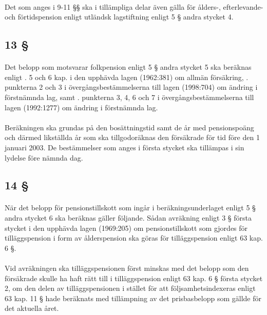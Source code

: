 \documentclass[a4paper,notitlepage,openany,10pt]{book}
\begin{document}
\paragraph*{}
Det som anges i 9-11 §§ ska i tillämpliga delar även gälla för ålders-, efterlevande- och förtidspension enligt utländsk lagstiftning enligt 5 § andra stycket 4.
\subsection*{13 §}
\paragraph*{}
Det belopp som motsvarar folkpension enligt 5 § andra stycket 5 ska beräknas enligt
. 5 och 6 kap. i den upphävda lagen (1962:381) om allmän försäkring,
. punkterna 2 och 3 i övergångsbestämmelserna till lagen (1998:704) om ändring i förstnämnda lag, samt
. punkterna 3, 4, 6 och 7 i övergångsbestämmelserna till lagen (1992:1277) om ändring i förstnämnda lag.
\paragraph*{}
Beräkningen ska grundas på den bosättningstid samt de år med pensionspoäng och därmed likställda år som ska tillgodoräknas den försäkrade för tid före den 1 januari 2003. De bestämmelser som anges i första stycket ska tillämpas i sin lydelse före nämnda dag.
\subsection*{14 §}
\paragraph*{}
När det belopp för pensionstillskott som ingår i beräkningsunderlaget enligt 5 § andra stycket 6 ska beräknas gäller följande. Sådan avräkning enligt 3 § första stycket i den upphävda lagen (1969:205) om pensionstillskott som gjordes för tilläggspension i form av ålderspension ska göras för tilläggspension enligt 63 kap. 6 §.
\paragraph*{}
Vid avräkningen ska tilläggspensionen först minskas med det belopp som den försäkrade skulle ha haft rätt till i tilläggspension enligt 63 kap. 6 § första stycket 2, om den delen av tilläggspensionen i stället för att följsamhetsindexeras enligt 63 kap. 11 § hade beräknats med tillämpning av det prisbasbelopp som gällde för det aktuella året.
\end{document}
